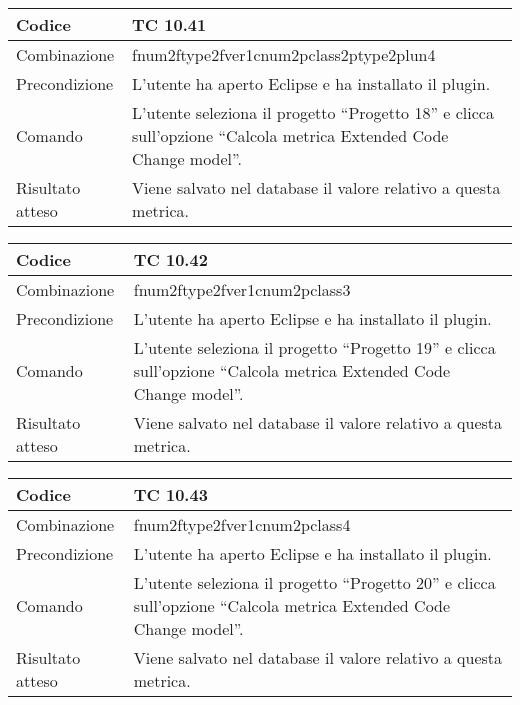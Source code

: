 \begin{table}[ht]
\begin{tabular}{|p{3cm}|p{9cm}|}
\hline
\cellcolor{lightgray}Codice				& TC 10.41								\\
\hline
\cellcolor{lightgray}Combinazione		& fnum2ftype2fver1cnum2pclass2ptype2plun4									\\
\hline
\cellcolor{lightgray}Precondizione		& L'utente ha aperto Eclipse e ha installato il plugin.		\\
\hline
\cellcolor{lightgray}Comando			& L'utente seleziona il progetto ``Progetto 18''  e clicca sull'opzione ``Calcola metrica Extended Code Change model''.	\\
\hline
\cellcolor{lightgray}Risultato atteso	& Viene salvato nel database il valore relativo a questa metrica.\\
\hline
\end{tabular}
\end{table}

\begin{table}[ht]
\begin{tabular}{|p{3cm}|p{9cm}|}
\hline
\cellcolor{lightgray}Codice				& TC 10.42								\\
\hline
\cellcolor{lightgray}Combinazione		& fnum2ftype2fver1cnum2pclass3									\\
\hline
\cellcolor{lightgray}Precondizione		& L'utente ha aperto Eclipse e ha installato il plugin.		\\
\hline
\cellcolor{lightgray}Comando			& L'utente seleziona il progetto ``Progetto 19''  e clicca sull'opzione ``Calcola metrica Extended Code Change model''.	\\
\hline
\cellcolor{lightgray}Risultato atteso	& Viene salvato nel database il valore relativo a questa metrica.\\
\hline
\end{tabular}
\end{table}

\clearpage

\begin{table}[ht]
\begin{tabular}{|p{3cm}|p{9cm}|}
\hline
\cellcolor{lightgray}Codice				& TC 10.43								\\
\hline
\cellcolor{lightgray}Combinazione		& fnum2ftype2fver1cnum2pclass4									\\
\hline
\cellcolor{lightgray}Precondizione		& L'utente ha aperto Eclipse e ha installato il plugin.		\\
\hline
\cellcolor{lightgray}Comando			& L'utente seleziona il progetto ``Progetto 20''  e clicca sull'opzione ``Calcola metrica Extended Code Change model''.	\\
\hline
\cellcolor{lightgray}Risultato atteso	& Viene salvato nel database il valore relativo a questa metrica.\\
\hline
\end{tabular}
\end{table}

